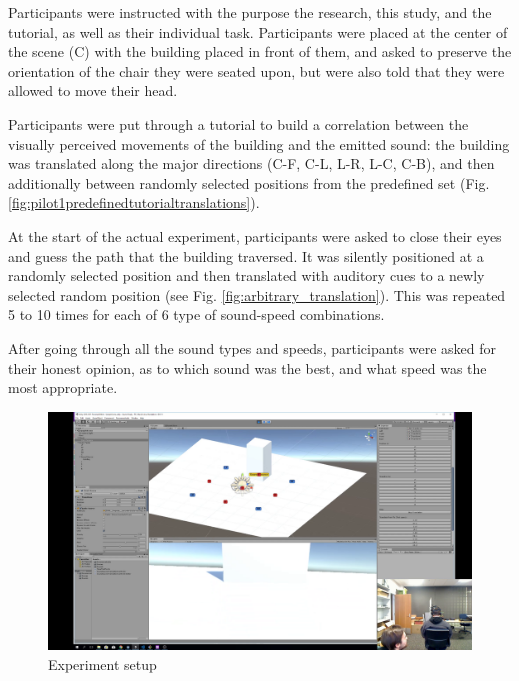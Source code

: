 Participants were instructed with the purpose the research, this study, and the tutorial, as well as their individual task. Participants were placed at the center of the scene (C) with the building placed in front of them, and asked to preserve the orientation of the chair they were seated upon, but were also told that they were allowed to move their head.

Participants were put through a tutorial to build a correlation between the visually perceived movements of the building and the emitted sound: the building was translated along the major directions (C-F, C-L, L-R, L-C, C-B), and then additionally between randomly selected positions from the predefined set (Fig. \ref{fig:pilot1predefinedtutorialtranslations}).

At the start of the actual experiment, participants were asked to close their eyes and guess the path that the building traversed. It was silently positioned at a randomly selected position and then translated with auditory cues to a newly selected random position (see Fig. \ref{fig:arbitrary_translation}). This was repeated 5 to 10 times for each of 6 type of sound-speed combinations.

After going through all the sound types and speeds, participants were asked for their honest opinion, as to which sound was the best, and what speed was the most appropriate.

\begin{figure}
	\centering
	\includegraphics[width=0.7\linewidth]{figures/placeholders/pilot1_experiment_setup.png}
	\caption{Experiment setup}
	\label{fig:clipimage001}
\end{figure}

